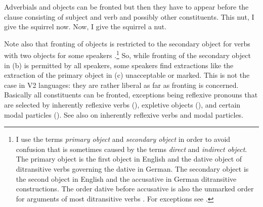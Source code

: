 \eal
{}
\zl 
Adverbials and objects can be fronted but then they have to appear before the clause consisting of
subject and verb and possibly other constituents.
\eal
\ex This nut, I give the squirrel now. 
\ex Now, I give the squirrel a nut.
\zl

Note also that fronting of objects is restricted to the secondary object for verbs with two objects
for some speakers \citep[]{Hudson92a-u}.\footnote{
  I use the terms \emph{primary object} and \emph{secondary object} in order to avoid confusion that is sometimes
  caused by the terms \emph{direct} and \emph{indirect object}. The primary object is the first object in English
  and the dative object of ditransitive verbs governing the dative in German. The secondary object
  is the second object in English and the accusative in German ditransitive constructions. The order
  dative before accusative is also the unmarked order for arguments of most ditransitive verbs
  \citep{Hoehle82a}. For exceptions see .
} So, while fronting of the secondary object in
(b) is permitted by all speakers, some speakers find extractions like the extraction of the
primary object in (c) unacceptable or marked.
\vspace{-\baselineskip}
\eal
\judgewidth{\%}
\zl
This is not the case in V2 languages: they are rather liberal as far as fronting
is concerned. Basically all constituents can be fronted, exceptions being reflexive
pronouns that are selected by inherently reflexive verbs (), expletive objects (), and certain modal
particles (). See also  on inherently reflexive verbs and modal particles.
\eal
{}
